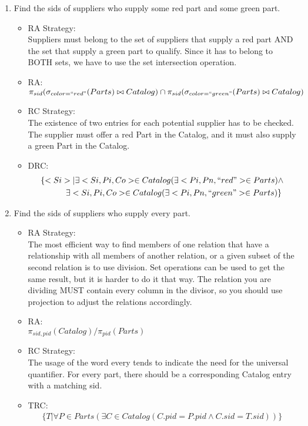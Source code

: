 \documentclass[12pt]{article}
\begin{document}
\begin{enumerate}
	\item Find the sids of suppliers who supply some red part and some green part. 
	
\begin{itemize}
\item RA Strategy: \\
Suppliers must belong to the set of suppliers that supply a red part AND the set that supply a green part to qualify. Since it has to belong to BOTH sets, we have to use the set intersection operation.
\item RA: \\
$\pi_{sid}(\sigma_{color=``red"}(Parts) \bowtie Catalog)\cap\pi_{sid}(\sigma_{color=``green"}(Parts) \bowtie Catalog)$
\item RC Strategy: \\
The existence of two entries for each potential supplier has to be checked. The supplier must offer a red Part in the Catalog, and it must also supply a green Part in the Catalog.
\item DRC:
\begin{multline*}
\{<Si>|\exists <Si,Pi,Co> \in Catalog(\exists<Pi,Pn,``red"> \in Parts) \wedge \\
	\hspace{1cm}\exists <Si,Pi,Co> \in Catalog(\exists<Pi,Pn,``green"> \in Parts)\} \\
\end{multline*}
\end{itemize}
	
	\item Find the sids of suppliers who supply every part. 

\begin{itemize}
\item RA Strategy: \\
The most efficient way to find members of one relation that have a relationship with all members of another relation, or a given subset of the second relation is to use division. Set operations can be used to get the same result, but it is harder to do it that way. The relation you are dividing MUST contain every column in the divisor, so you should use projection to adjust the relations accordingly.
\item RA: \\
$\pi_{sid,pid}(Catalog)/\pi_{pid}(Parts)$
\item RC Strategy: \\
The usage of the word every tends to indicate the need for the universal quantifier. For every part, there should be a corresponding Catalog entry with a matching sid.
\item TRC:
\begin{multline*}
\{T|\forall P \in Parts(\exists C \in Catalog(C.pid = P.pid \wedge C.sid = T.sid))\} \\
\end{multline*}
\end{itemize}	
	

\end{enumerate}
\end{document}
